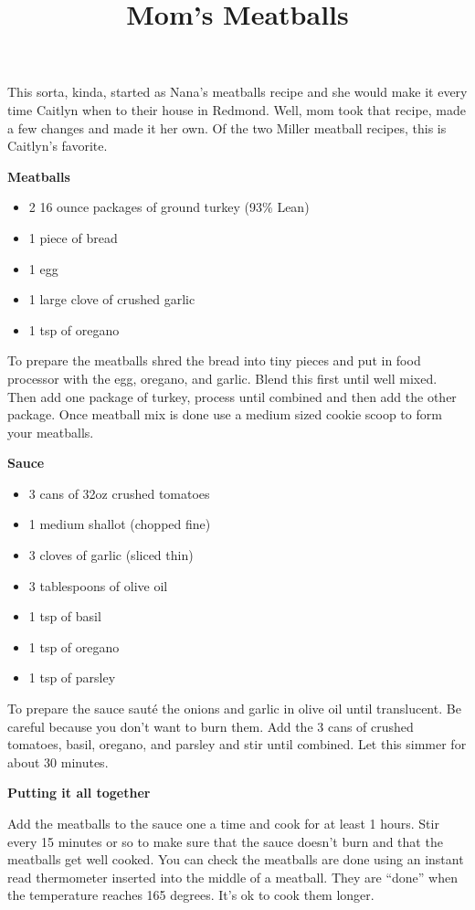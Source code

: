 \documentclass{article}
\title{Mom's Meatballs}
\begin{document}
This sorta, kinda, started as Nana's meatballs recipe and she would make it every time Caitlyn
when to their house in Redmond. Well, mom took that recipe, made a few changes and made it her
own. Of the two Miller meatball recipes, this is Caitlyn's favorite.

\textbf{Meatballs}

\begin{itemize}
      \item 2 16 ounce packages of ground turkey (93\% Lean)
      \item 1 piece of bread
      \item 1 egg
      \item 1 large clove of crushed garlic
      \item 1 tsp of oregano
\end{itemize}

To prepare the meatballs shred the bread into tiny pieces and put in food processor with the egg, oregano, and garlic.
Blend this first until well mixed. Then add one package of turkey, process until combined and then add the other package.
Once meatball mix is done use a medium sized cookie scoop to form your meatballs.

\textbf{Sauce}

\begin{itemize}
      \item 3 cans of 32oz crushed tomatoes
      \item 1 medium shallot (chopped fine)
      \item 3 cloves of garlic (sliced thin)
      \item 3 tablespoons of olive oil
      \item 1 tsp of basil
      \item 1 tsp of oregano
      \item 1 tsp of parsley
\end{itemize}

To prepare the sauce sauté the onions and garlic in olive oil until translucent. Be careful because you don't want to burn
them. Add the 3 cans of crushed tomatoes, basil, oregano, and parsley and stir until combined. Let this simmer for about 30
minutes.

\textbf{Putting it all together}

Add the meatballs to the sauce one a time and cook for at least 1 hours. Stir every 15 minutes or so to make
sure that the sauce doesn't burn and that the meatballs get well cooked. You can check the meatballs are done using
an instant read thermometer inserted into the middle of a meatball. They are ``done'' when the temperature reaches
165 degrees. It's ok to cook them longer.


\end{document}
